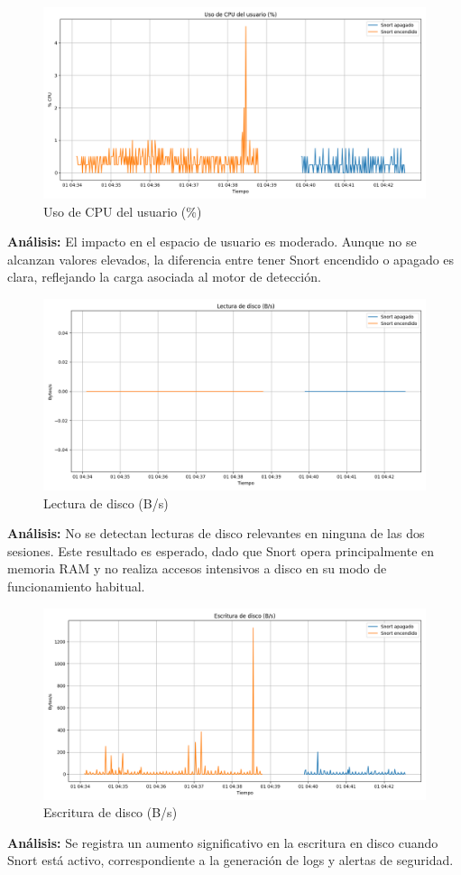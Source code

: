 \documentclass[12pt,a4paper]{report}
\begin{document}
\begin{figure}[H]
	\centering
	\includegraphics[width=\textwidth]{graficas/cpu_usr.png}
	\caption{Uso de CPU del usuario (\%)}
\end{figure}
\textbf{Análisis:} El impacto en el espacio de usuario es moderado. Aunque no se alcanzan valores elevados, la diferencia entre tener Snort encendido o apagado es clara, reflejando la carga asociada al motor de detección.

\begin{figure}[H]
	\centering
	\includegraphics[width=\textwidth]{graficas/disk_read.png}
	\caption{Lectura de disco (B/s)}
\end{figure}
\textbf{Análisis:} No se detectan lecturas de disco relevantes en ninguna de las dos sesiones. Este resultado es esperado, dado que Snort opera principalmente en memoria RAM y no realiza accesos intensivos a disco en su modo de funcionamiento habitual.

\begin{figure}[H]
	\centering
	\includegraphics[width=\textwidth]{graficas/disk_write.png}
	\caption{Escritura de disco (B/s)}
\end{figure}
\textbf{Análisis:} Se registra un aumento significativo en la escritura en disco cuando Snort está activo, correspondiente a la generación de logs y alertas de seguridad.
\end{document}
